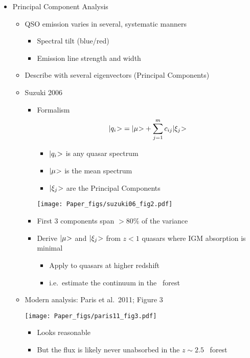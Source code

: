 \documentclass[12pt,letterpaper]{article}
\begin{document}
\begin{Aenumerate}
\begin{itemize}
 \item Principal Component Analysis
 	\begin{itemize}
 	\item QSO emission varies in several, systematic manners
 	  \begin{itemize}
 	  \item Spectral tilt (blue/red)
 	  \item Emission line strength and width
 	  \end{itemize}
 	\item Describe with several eigenvectors (Principal Components)
	\item Suzuki 2006
		\begin{itemize}
		\item Formalism
 	    \begin{equation}
 	    {|q_i\negmedspace>} = {|\mu\negmedspace>} + \sum\limits_{j=1}^{m} c_{ij} {|\xi_j\negmedspace>}
 	    \end{equation}
 	    	\begin{itemize}
	 	    \item ${|q_i\negmedspace>}$ is any quasar spectrum
	 	    \item ${|\mu\negmedspace>}$ is the mean spectrum
	 	    \item ${|\xi_j\negmedspace>}$ are the Principal Components
	 	    \end{itemize}

	\texttt{[image: Paper\_figs/suzuki06\_fig2.pdf]}

	 	\item First 3 components span $>80\%$ of the variance
	 	\item Derive ${|\mu\negmedspace>}$ and ${|\xi_j\negmedspace>}$ from 
	 	$z < 1$ quasars where IGM absorption is minimal
	 		\begin{itemize}
		 	\item Apply to quasars at higher redshift
		 	\item i.e.\ estimate the continuum in the \lya\ forest 
	 		\end{itemize}
		\end{itemize}

	\item Modern analysis: Paris et al.\ 2011; Figure 3

	\texttt{[image: Paper\_figs/paris11\_fig3.pdf]}

	  \begin{itemize}
	  \item Looks reasonable
	  \item But the flux is likely never unabsorbed in the
	  $z \sim 2.5$ \lya\ forest
	  \end{itemize}


\end{itemize}
\end{itemize}
\end{Aenumerate}
\end{document}
